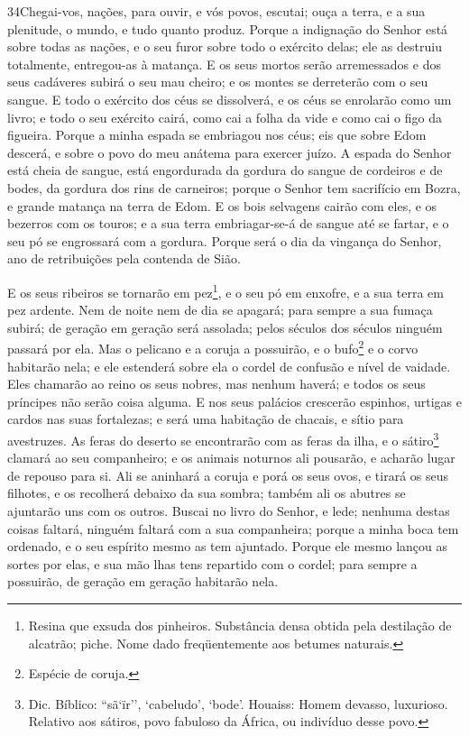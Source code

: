 \medskip

\lettrine{34}{}Chegai-vos, nações, para ouvir, e vós povos,
escutai; ouça a terra, e a sua plenitude, o mundo, e tudo quanto
produz. Porque a indignação do Senhor está sobre todas as
nações, e o seu furor sobre todo o exército delas; ele as destruiu
totalmente, entregou-as à matança. E os seus mortos serão
arremessados e dos seus cadáveres subirá o seu mau cheiro; e os
montes se derreterão com o seu sangue. E todo o exército dos
céus se dissolverá, e os céus se enrolarão como um livro; e todo o
seu exército cairá, como cai a folha da vide e como cai o figo da
figueira. Porque a minha espada se embriagou nos céus; eis que
sobre Edom descerá, e sobre o povo do meu anátema para exercer
juízo. A espada do Senhor está cheia de sangue, está engordurada
da gordura do sangue de cordeiros e de bodes, da gordura dos rins de
carneiros; porque o Senhor tem sacrifício em Bozra, e grande matança
na terra de Edom. E os bois selvagens cairão com eles, e os
bezerros com os touros; e a sua terra embriagar-se-á de sangue até
se fartar, e o seu pó se engrossará com a gordura. Porque será o
dia da vingança do Senhor, ano de retribuições pela contenda de
Sião.

E os seus ribeiros se tornarão em pez\footnote{Resina que exsuda
dos pinheiros. Substância densa obtida pela destilação de alcatrão;
piche. Nome dado freqüentemente aos betumes naturais.}, e o seu pó
em enxofre, e a sua terra em pez ardente. Nem de noite nem de
dia se apagará; para sempre a sua fumaça subirá; de geração em
geração será assolada; pelos séculos dos séculos ninguém passará por
ela. Mas o pelicano e a coruja a possuirão, e o
bufo\footnote{Espécie de coruja.} e o corvo habitarão nela; e ele
estenderá sobre ela o cordel de confusão e nível de vaidade.
Eles chamarão ao reino os seus nobres, mas nenhum haverá; e
todos os seus príncipes não serão coisa alguma. E nos seus
palácios crescerão espinhos, urtigas e cardos nas suas fortalezas; e
será uma habitação de chacais, e sítio para avestruzes. As
feras do deserto se encontrarão com as feras da ilha, e o
sátiro\footnote{Dic. Bíblico: ``sã`ïr'', `cabeludo', `bode'.
Houaiss: Homem devasso, luxurioso. Relativo aos sátiros, povo
fabuloso da África, ou indivíduo desse povo.} clamará ao seu
companheiro; e os animais noturnos ali pousarão, e acharão lugar de
repouso para si. Ali se aninhará a coruja e porá os seus
ovos, e tirará os seus filhotes, e os recolherá debaixo da sua
sombra; também ali os abutres se ajuntarão uns com os outros.
Buscai no livro do Senhor, e lede; nenhuma destas coisas
faltará, ninguém faltará com a sua companheira; porque a minha boca
tem ordenado, e o seu espírito mesmo as tem ajuntado. Porque
ele mesmo lançou as sortes por elas, e sua mão lhas tens repartido
com o cordel; para sempre a possuirão, de geração em geração
habitarão nela.

